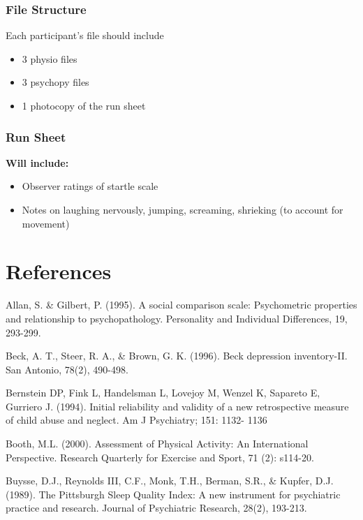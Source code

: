 \documentclass[]{book}
\providecommand{\tightlist}{%
  \setlength{\itemsep}{0pt}\setlength{\parskip}{0pt}}
\begin{document}
\hypertarget{file-structure}{%
\subsection{File Structure}\label{file-structure}}

Each participant's file should include

\begin{itemize}
\tightlist
\item
  3 physio files
\item
  3 psychopy files
\item
  1 photocopy of the run sheet
\end{itemize}

\hypertarget{run-sheet}{%
\subsection{Run Sheet}\label{run-sheet}}

\textbf{Will include:}

\begin{itemize}
\tightlist
\item
  Observer ratings of startle scale
\item
  Notes on laughing nervously, jumping, screaming, shrieking (to account for movement)
\end{itemize}

\hypertarget{references}{%
\chapter{References}\label{references}}

Allan, S. \& Gilbert, P. (1995). A social comparison scale: Psychometric properties and
relationship to psychopathology. Personality and Individual Differences, 19, 293-299.

Beck, A. T., Steer, R. A., \& Brown, G. K. (1996). Beck depression inventory-II. San Antonio, 78(2), 490-498.

Bernstein DP, Fink L, Handelsman L, Lovejoy M, Wenzel K, Sapareto E, Gurriero J. (1994). Initial reliability and
validity of a new retrospective measure of child abuse and neglect. Am J Psychiatry; 151: 1132-
1136

Booth, M.L. (2000). Assessment of Physical Activity: An International Perspective. Research Quarterly for Exercise and Sport, 71 (2): s114-20.

Buysse, D.J., Reynolds III, C.F., Monk, T.H., Berman, S.R., \& Kupfer, D.J. (1989). The Pittsburgh Sleep Quality Index: A new instrument for psychiatric practice and research. Journal of Psychiatric Research, 28(2), 193-213.
\end{document}
